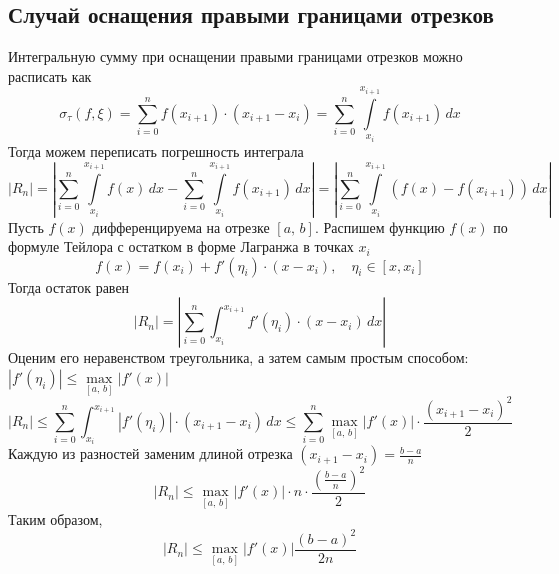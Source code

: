 \documentclass[a4paper, 11pt]{article}
\begin{document}
	\subsection{Случай оснащения правыми границами отрезков}
	Интегральную сумму при оснащении правыми границами отрезков можно расписать как
	\begin{equation}
		\sigma_{\tau}(f, \xi) = \sum_{i=0}^n f(x_{i+1}) \cdot (x_{i+1}-x_i) = \sum_{i=0}^n \int\limits_{x_{i}}^{x_{i+1}} f(x_{i+1}) \, dx
	\end{equation}
	Тогда можем переписать погрешность интеграла
	\begin{equation}\label{11}
		\left|R_n\right| = \left| \sum_{i=0}^{n} \int\limits_{x_{i}}^{x_{i+1}} f(x) \, dx - \sum_{i=0}^n \int\limits_{x_{i}}^{x_{i+1}} f(x_{i+1}) \, dx \right| = \left| \sum_{i=0}^n \int\limits_{x_{i}}^{x_{i+1}}\left(f(x) - f(x_{i+1})\right) \, dx \right|
	\end{equation}
	Пусть $f(x)$ дифференцируема на отрезке $[a,\,b]$. Распишем функцию $f(x)$ по формуле Тейлора с остатком в форме Лагранжа в точках $x_{i}$
	\begin{equation}\label{key}
		f(x) = f(x_{i}) + f'(\eta_i) \cdot (x-x_{i}), \quad \eta_i \in [x, x_{i}]
	\end{equation}
	Тогда остаток равен
	\begin{equation}\label{key}
		\left|R_n\right| = \left| \sum_{i=0}^n \int_{x_i}^{x_{i+1}} f'(\eta_i) \cdot (x - x_{i})\, dx\right|
	\end{equation}
	Оценим его неравенством треугольника, а затем самым простым способом: $\left|f'(\eta_i)\right| \leqslant \max\limits_{[a,\,b]} \left|f'(x)\right|$
	\begin{equation}\label{14}
		\left|R_n\right| \leqslant \sum_{i=0}^n \int_{x_i}^{x_{i+1}} \left|f'(\eta_i)\right| \cdot (x_{i+1} - x_i)\, dx  \leqslant \sum_{i=0}^n \max\limits_{[a,\,b]} \left|f'(x)\right| \cdot \frac{(x_{i+1} - x_i)^2}{2} 
	\end{equation} 
	Каждую из разностей заменим длиной отрезка $(x_{i+1} - x_i) = \frac{b-a}{n}$
	\begin{equation}\label{15}
		\left|R_n\right| \leqslant \max\limits_{[a,\,b]} \left|f'(x)\right| \cdot n \cdot \frac{\left(\frac{b-a}{n}\right)^2}{2}
	\end{equation}
	Таким образом, 
	\begin{equation}\label{16}
		 \left|R_n\right| \leqslant \max\limits_{[a,\,b]} \left|f'(x)\right| \frac{(b-a)^2}{2n}
	\end{equation}
\end{document}
